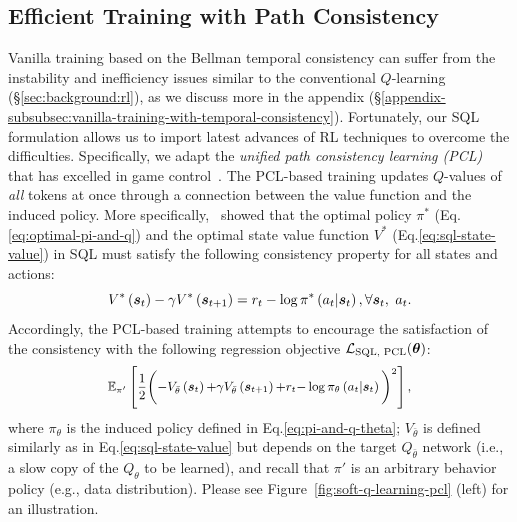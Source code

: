 \subsection{Efficient Training with Path Consistency}
\label{subsec:method:pcl}

Vanilla training based on the Bellman temporal consistency can suffer from the instability and inefficiency issues similar to the conventional $Q$-learning (\S\ref{sec:background:rl}), as we discuss more in the appendix (\S\ref{appendix-subsubsec:vanilla-training-with-temporal-consistency}). Fortunately, our SQL formulation allows us to import latest advances of RL techniques to overcome the difficulties.
Specifically, we adapt the \emph{unified path consistency learning (PCL)} that has excelled in game control~\citep{nachum2017bridging}.
The PCL-based training updates $Q$-values of \emph{all} tokens at once through a connection between the value function and the induced policy.
More specifically,~\citet{nachum2017bridging} showed that the optimal policy $\pi^*$ (Eq.\ref{eq:optimal-pi-and-q}) and the optimal state value function $V^*$ (Eq.\ref{eq:sql-state-value}) in SQL must satisfy the following consistency property for 
all states and actions:
\begin{equation}
\small
    V^*\left(\bm{s}_{t}\right)-\gamma V^*\left(\bm{s}_{t+1}\right) = r_t - \log \pi^*\left(a_{t} | \bm{s}_{t}\right), \forall \bm{s}_t,\  a_t.
    \label{eq:pcl}
\end{equation}
Accordingly, the PCL-based training attempts to encourage the satisfaction of the consistency with the following regression objective $\mathcal{L}_{\text{SQL, PCL}} (\bm{\theta})$:
\begin{equation}
\small
\begin{aligned}
    {\mathbb{E}}_{\pi'}\left[\frac{1}{2}\bigg({-}V_{\bar{{\theta}}}\left(\bm{s}_{t}\right){+}\gamma V_{\bar{{\theta}}}\left(\bm{s}_{t+1}\right) {+} 
    r_t {-} \log \pi_{{\theta}}\left(a_{t} | \bm{s}_{t}\right)\bigg)^{2}\right],
    \label{eq:pcl-loss}
\end{aligned}
\end{equation}
where $\pi_\theta$ is the induced policy defined in Eq.\eqref{eq:pi-and-q-theta}; $V_{\bar{{\theta}}}$ is defined similarly as in Eq.\eqref{eq:sql-state-value} but depends on the target $Q_{\bar{\theta}}$ network (i.e., a slow copy of the $Q_\theta$ to be learned), and recall that $\pi'$ is an arbitrary behavior policy (e.g., data distribution). 
Please see Figure~\ref{fig:soft-q-learning-pcl} (left) for an illustration. 

